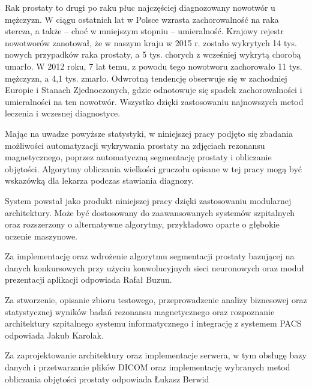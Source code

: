 \documentclass[a4paper,11pt,twoside]{report}
\theoremstyle{definition}
\begin{document}
Rak prostaty to drugi po raku płuc najczęściej diagnozowany nowotwór u mężczyzn. W ciągu ostatnich lat w Polsce wzrasta zachorowalność na raka stercza, a także – choć w mniejszym stopniu – umieralność. Krajowy rejestr nowotworów zanotował, że w naszym kraju w 2015 r. zostało wykrytych 14 tys. nowych przypadków raka prostaty, a 5 tys. chorych z wcześniej wykrytą chorobą umarło. W 2012 roku, 7 lat temu, z powodu tego nowotworu zachorowało 11 tys. mężczyzn, a 4,1 tys. zmarło. Odwrotną tendencję obserwuje się w zachodniej Europie i Stanach Zjednoczonych, gdzie odnotowuje się spadek zachorowalności i umieralności na ten nowotwór. Wszystko dzięki zastosowaniu najnowszych metod leczenia i wczesnej diagnostyce. \cite{rynekZdrowia}
\par
Mając na uwadze powyższe statystyki, w niniejszej pracy podjęto się zbadania możliwości automatyzacji wykrywania prostaty na zdjęciach rezonansu magnetycznego, poprzez automatyczną segmentację prostaty i obliczanie objętości. Algorytmy obliczania wielkości gruczołu opisane w tej pracy mogą być wskazówką dla lekarza podczas stawiania diagnozy. 
\par
System powstał jako produkt niniejszej pracy dzięki zastosowaniu modularnej architektury. Może być dostosowany do zaawansowanych systemów szpitalnych oraz rozszerzony o alternatywne algorytmy, przykładowo oparte o głębokie uczenie maszynowe.
\par
Za implementację oraz wdrożenie algorytmu segmentacji prostaty bazującej na danych konkursowych przy użyciu konwolucyjnych sieci neuronowych oraz moduł prezentacji aplikacji odpowiada Rafał Buzun.
\par
Za stworzenie, opisanie zbioru testowego, przeprowadzenie analizy biznesowej oraz statystycznej wyników badań rezonansu magnetycznego oraz rozpoznanie architektury szpitalnego systemu informatycznego i integrację z systemem PACS odpowiada Jakub Karolak.
\par
Za zaprojektowanie architektury oraz implementacje serwera, w tym obsługę bazy danych i przetwarzanie plików DICOM oraz implementację wybranych metod obliczania objętości prostaty odpowiada Łukasz Berwid
\end{document}
